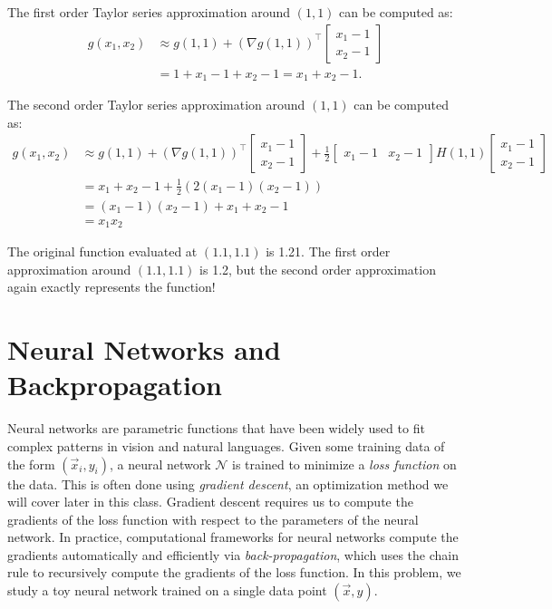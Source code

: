 \documentclass[10pt]{article}
\theoremstyle{definition}
\theoremstyle{plain}
\begin{document}
\begin{enumerate}[label=(\alph*)]
\begin{enumerate}[label=\roman*.]
    The first order Taylor series approximation around $(1,1)$ can be computed as:
    \begin{align}
    g(x_1, x_2) &\approx g(1,1) + (\nabla g(1,1))^\top \begin{bmatrix} x_1 - 1 \\ x_2 - 1 \end{bmatrix} \\
    &= 1 + x_1 - 1 + x_2 - 1 = x_1 + x_2 - 1.
    \end{align}

    The second order Taylor series approximation around $(1,1)$ can be computed as:
    \begin{align}
    g(x_1, x_2) &\approx g(1,1) + (\nabla g(1,1))^\top \begin{bmatrix} x_1 - 1 \\ x_2 - 1 \end{bmatrix} + \frac{1}{2}\begin{bmatrix} x_1 - 1 & x_2 - 1 \end{bmatrix} H(1,1) \begin{bmatrix} x_1 - 1 \\ x_2 - 1 \end{bmatrix} \\
    &= x_1 + x_2 - 1 + \frac{1}{2}(2(x_1 - 1)(x_2 - 1)) \\
    &= (x_1 - 1)(x_2 - 1) + x_1 + x_2 - 1 \\
    &= x_1 x_2
    \end{align}

    The original function evaluated at $(1.1, 1.1)$ is 1.21. The first order approximation around $(1.1, 1.1)$ is 1.2, but the second order approximation again exactly represents the function!
\end{enumerate}
\end{enumerate}

\section{Neural Networks and Backpropagation}

Neural networks are parametric functions that have been widely used to fit complex patterns in vision and natural languages. Given some training data of the form $(\vec{x}_i, y_i)$, a neural network $\mathcal{N}$ is trained to minimize a \emph{loss function} on the data. This is often done using \emph{gradient descent}, an optimization method we will cover later in this class. Gradient descent requires us to compute the gradients of the loss function with respect to the parameters of the neural network. In practice, computational frameworks for neural networks compute the gradients automatically and efficiently via \emph{back-propagation}, which uses the chain rule to recursively compute the gradients of the loss function. In this problem, we study a toy neural network trained on a single data point $(\vec{x}, y)$.
\end{document}
